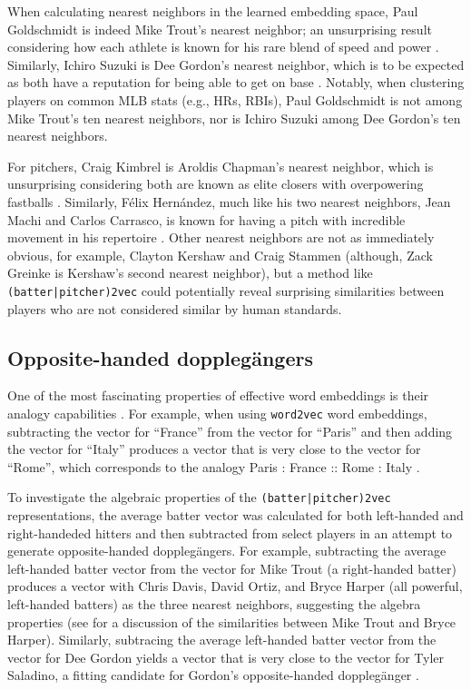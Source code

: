 \documentclass{article}
\begin{document}
When calculating nearest neighbors in the learned embedding space, Paul Goldschmidt is indeed Mike Trout's nearest neighbor; an unsurprising result considering how each athlete is known for his rare blend of speed and power \parencite{Kory2015}. Similarly, Ichiro Suzuki is Dee Gordon's nearest neighbor, which is to be expected as both have a reputation for being able to get on base \parencite{Sullivan2015}. Notably, when clustering players on common MLB stats (e.g., HRs, RBIs), Paul Goldschmidt is not among Mike Trout's ten nearest neighbors, nor is Ichiro Suzuki among Dee Gordon's ten nearest neighbors.

For pitchers, Craig Kimbrel is Aroldis Chapman's nearest neighbor, which is unsurprising considering both are known as elite closers with overpowering fastballs \parencite{Mirsky2016}. Similarly, Félix Hernández, much like his two nearest neighbors, Jean Machi and Carlos Carrasco, is known for having a pitch with incredible movement in his repertoire \parencite{Buchanan2015, Romano2015, Berg2016}. Other nearest neighbors are not as immediately obvious, for example, Clayton Kershaw and Craig Stammen (although, Zack Greinke is Kershaw's second nearest neighbor), but a method like \texttt{(batter|pitcher)2vec} could potentially reveal surprising similarities between players who are not considered similar by human standards.

\subsection{Opposite-handed dopplegängers}

One of the most fascinating properties of effective word embeddings is their analogy capabilities \parencite{Mikolov2013a}. For example, when using \texttt{word2vec} word embeddings, subtracting the vector for ``France'' from the vector for ``Paris'' and then adding the vector for ``Italy'' produces a vector that is very close to the vector for ``Rome'', which corresponds to the analogy Paris : France :: Rome : Italy \parencite{Mikolov2013a}.

To investigate the algebraic properties of the \texttt{(batter|pitcher)2vec} representations, the average batter vector was calculated for both left-handed and right-handeded hitters and then subtracted from select players in an attempt to generate opposite-handed dopplegängers. For example, subtracting the average left-handed batter vector from the vector for Mike Trout (a right-handed batter) produces a vector with Chris Davis, David Ortiz, and Bryce Harper (all powerful, left-handed batters) as the three nearest neighbors, suggesting the algebra properties (see \parencite{Spector2016} for a discussion of the similarities between Mike Trout and Bryce Harper). Similarly, subtracing the average left-handed batter vector from the vector for Dee Gordon yields a vector that is very close to the vector for Tyler Saladino, a fitting candidate for Gordon's opposite-handed dopplegänger \parencite{Chamberlain2017}.
\end{document}

